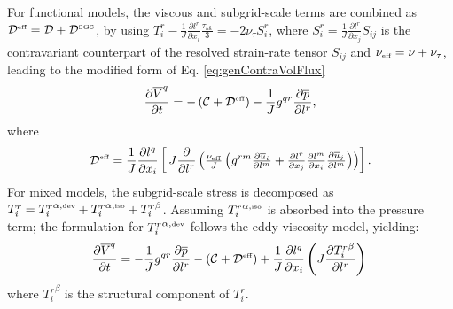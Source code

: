 \documentclass[final,3p]{elsarticle}
\begin{document}
For functional models, the viscous and subgrid-scale terms are combined as $\mathcal{D}^{\hbox{\tiny eff}}=\mathcal{D} + \mathcal{D^{\hbox{\tiny SGS}}}$, by using $T^r_i- \frac{1}{J}\frac{\partial l^{r}}{\partial x_i} \frac{\tau_{kk}}{3} = -2 \nu_{\tau} S^r_i$, where $S^r_i =  \frac{1}{J}\frac{\partial l^{r}}{\partial x_j} S_{ij}$ is the contravariant counterpart of the resolved strain-rate tensor $S_{ij}$ and $\nu_{\hbox{\tiny eff}} = \nu + \nu_{\tau}$, leading to the modified form of Eq. \ref{eq:genContraVolFlux}
\begin{equation}
	\frac{\partial \overline{V}^{q}}{\partial t} = - \left(\mathcal{C} + \mathcal{D}^{\hbox{\tiny eff}}\right) - \frac{1}{J} g^{qr} \frac{\partial \overline{p}}{\partial l^{r}},
	\label{eq:genContraVolFlux2}
\end{equation}
where
$$
\mathcal{D}^{\hbox{\tiny eff}} = 
\frac{1}{J}\frac{\partial l^q}{\partial x_i}
\left[\,
J\frac{\partial}{\partial l^r}
\left(\tfrac{\nu_{\hbox{\tiny eff}}}{J}\left(g^{rm}\tfrac{\partial \overline{u}_i}{\partial l^m}
+\tfrac{\partial l^r}{\partial x_j}\tfrac{\partial l^m}{\partial x_i}\tfrac{\partial \overline{u}_j}{\partial l^m}
\right)\right)
\right].
$$
For mixed models, the subgrid-scale stress is decomposed as $T^r_{i} = {T^r_{i}}^{\alpha, \hbox{\tiny dev}} + {T^r_{i}}^{\alpha, \hbox{\tiny iso}} + {T^r_{i}}^{\beta}$. Assuming ${T^r_{i}}^{\alpha, \hbox{\tiny iso}}$ is absorbed into the pressure term; the formulation for ${T^r_{i}}^{\alpha, \hbox{\tiny dev}}$ follows the eddy viscosity model, yielding:
\begin{equation}
	\frac{\partial \overline{V}^{q}}{\partial t} = - \frac{1}{J} g^{qr} \frac{\partial \overline{p}}{\partial l^{r}} - \left(\mathcal{C} + \mathcal{D}^{\hbox{\tiny eff}}\right) + \frac{1}{J}\frac{\partial l^q}{\partial x_i} \left(J \frac{\partial {T^r_{i}}^{\beta}}{\partial l^r}\right)\,
	\label{eq:genContraVolFluxMixedModel}
\end{equation}
where ${T^r_i}^{\beta}$ is the structural component of $T^r_i$. 
\end{document}
